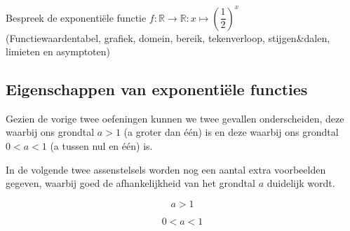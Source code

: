 \documentclass[12pt,twoside,a4paper]{article}
\begin{document}
\begin{oefening}
Bespreek de exponentiële functie $f:\mathbb{R}\to\mathbb{R}: x\mapsto \left(\dfrac{1}{2}\right)^x$\\
(Functiewaardentabel, grafiek, domein, bereik, tekenverloop, stijgen\&dalen, limieten en asymptoten)
\end{oefening}

\subsection{Eigenschappen van exponentiële functies}

Gezien de vorige twee oefeningen kunnen we twee gevallen onderscheiden, deze waarbij ons grondtal $a>1$ (a groter dan één) is en deze waarbij ons grondtal $0<a<1$ (a tussen nul en één) is.

In de volgende twee assenstelsels worden nog een aantal extra voorbeelden gegeven, waarbij goed de afhankelijkheid van het grondtal $a$ duidelijk wordt.

\begin{minipage}{0.5\textwidth}
$$a>1$$
\begin{center}
\end{center}
\end{minipage}
\begin{minipage}{0.5\textwidth}
$$0<a<1$$
\begin{center}
\end{center}
\end{minipage}
\end{document}
